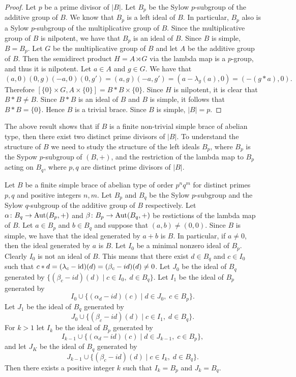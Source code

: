\begin{proof}
    Let $p$ be a prime divisor of $|B|$. Let $B_p$ be the Sylow $p$-subgroup of the additive group of $B$. We know that $B_p$ is a left ideal of $B$. In particular, $B_p$ also is a Sylow $p$-subgroup of the multiplicative group of $B$. Since the multiplicative group of $B$ is nilpotent, we have that $B_p$ is an ideal of $B$. Since $B$ is simple, $B=B_p$. Let $G$ be the multiplicative group of $B$ and let $A$ be the additive group of $B$. Then the semidirect product $H=A\rtimes G$ via the lambda map is a $p$-group, and thus it is nilpotent. Let $a\in A$ and $g\in G$. We have that 
    $$(a,0)(0,g)(-a,0)(0,g')=(a,g)(-a,g')=(a-\lambda_g(a),0)=(-(g*a),0).$$
    Therefore $[\{0\}\times G,A\times\{0\}]=B*B\times \{0\}$. Since $H$ is nilpotent, it is clear that $B*B\neq B$. Since $B*B$ is an ideal of $B$ and $B$ is simple, it follows that $B*B=\{0\}$. Hence $B$ is a trivial brace. Since $B$ is simple, $|B|=p$.   
\end{proof}

The above result shows that if $B$ is a finite non-trivial simple brace of abelian type, 
then there exist two distinct prime divisors of $|B|$. To understand the structure of $B$ we need to study the structure of the left ideals $B_p$, where $B_p$ is the Sypow $p$-subgroup of $(B,+)$, and the restriction of the lambda map to $B_p$ acting on $B_q$, where $p,q$ are distinct prime divisors of $|B|$.


Let $B$ be a finite simple brace of abelian type of order $p^nq^m$ for distinct primes $p,q$ and positive integers $n,m$. Let $B_p$ and $B_q$ be the Sylow $p$-subgroup and the Sylow $q$-subgroup of the additive group of $B$ respectively. Let $\alpha\colon B_q\rightarrow \operatorname{Aut}(B_p,+)$ and $\beta\colon B_p\rightarrow \operatorname{Aut}(B_q,+)$ be restictions of the lambda map of $B$. Let $a\in B_p$ and $b\in B_q$ and suppose that $(a,b)\neq (0,0)$. Since $B$ is simple, we have that the ideal generated by $a+b$ is $B$. In particular,  if $a\neq 0$, then the ideal generated by $a$ is $B$. Let $I_0$ be a minimal nonzero ideal of $B_p$. Clearly $I_0$ is not an ideal of $B$. This means that there exist $d\in B_q$ and $c\in I_0$ such that $c*d=(\lambda_c-\operatorname{id})(d)=(\beta_c-id)(d)\neq 0$. Let 
$J_0$ be the ideal of $B_q$ generated by $\{ (\beta_c-id)(d)\mid c\in I_0, \; d\in B_q\}$. Let $I_1$ be the ideal of $B_p$ generated by 
$$I_0\cup \{(\alpha_d-id)(c)\mid d\in J_0,\; c\in B_p\}.$$ 
Let $J_1$ be the ideal of $B_q$ generated by 
$$J_0\cup \{(\beta_c-id)(d)\mid c\in I_1,\; d\in B_q\}.$$
For $k>1$ let  $I_k$ be the ideal of $B_p$ generated by 
$$I_{k-1}\cup \{(\alpha_d-id)(c)\mid d\in J_{k-1},\; c\in B_p\},$$ and let $J_K$ be the ideal of $B_q$ generated by 
$$J_{k-1}\cup \{(\beta_c-id)(d)\mid c\in I_k,\; d\in B_q\}.$$
Then there exists a positive integer $k$ such that $I_k=B_p$ and $J_k=B_q$. 

